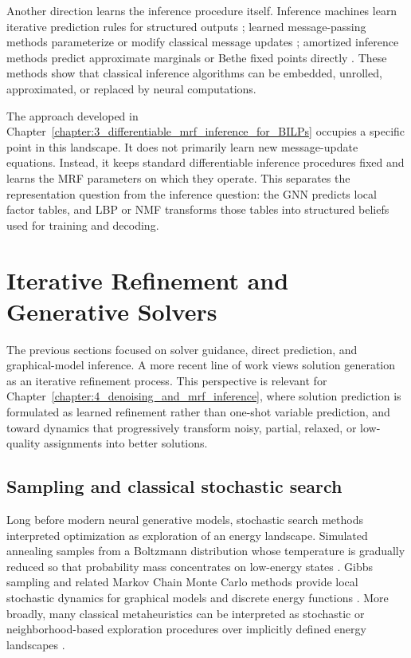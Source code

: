 Another direction learns the inference procedure itself. Inference machines learn iterative prediction rules for structured outputs \cite{ross_learning_2011}; learned message-passing methods parameterize or modify classical message updates \cite{heess_learning_2013}; amortized inference methods predict approximate marginals or Bethe fixed points directly \cite{wiseman_amortized_2019}. These methods show that classical inference algorithms can be embedded, unrolled, approximated, or replaced by neural computations.

The approach developed in Chapter~\ref{chapter:3_differentiable_mrf_inference_for_BILPs} occupies a specific point in this landscape. It does not primarily learn new message-update equations. Instead, it keeps standard differentiable inference procedures fixed and learns the MRF parameters on which they operate. This separates the representation question from the inference question: the GNN predicts local factor tables, and LBP or NMF transforms those tables into structured beliefs used for training and decoding.

\section{Iterative Refinement and Generative Solvers}
\label{sec:rw_iterative_refinement}

The previous sections focused on solver guidance, direct prediction, and graphical-model inference. A more recent line of work views solution generation as an iterative refinement process. This perspective is relevant for Chapter~\ref{chapter:4_denoising_and_mrf_inference}, where solution prediction is formulated as learned refinement rather than one-shot variable prediction, and toward dynamics that progressively transform noisy, partial, relaxed, or low-quality assignments into better solutions.

\subsection{Sampling and classical stochastic search}
\label{subsec:rw_sampling_search}

Long before modern neural generative models, stochastic search methods interpreted optimization as exploration of an energy landscape. Simulated annealing samples from a Boltzmann distribution whose temperature is gradually reduced so that probability mass concentrates on low-energy states \cite{kirkpatrick_optimization_1983,hajek_cooling_1988}. Gibbs sampling and related Markov Chain Monte Carlo methods provide local stochastic dynamics for graphical models and discrete energy functions \cite{geman_stochastic_1984}. More broadly, many classical metaheuristics can be interpreted as stochastic or neighborhood-based exploration procedures over implicitly defined energy landscapes \cite{blum_metaheuristics_2003}.

